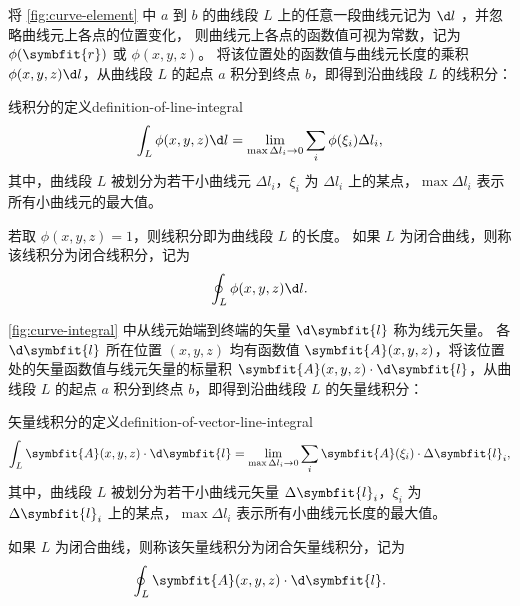 
将 \cref{fig:curve-element} 中 $ a $ 到 $ b $ 的曲线段 $ L $ 上的任意一段曲线元记为 $ \d l $ ，并忽略曲线元上各点的位置变化，
则曲线元上各点的函数值可视为常数，记为 $ \phi (\symbfit{r}) $ 或 $ \phi (x, y, z) $。
将该位置处的函数值与曲线元长度的乘积 $ \phi (x, y, z) \d l $，从曲线段 $ L $ 的起点 $ a $ 积分到终点 $ b $，即得到沿曲线段 $ L $ 的线积分：
\begin{definition}{线积分的定义}{definition-of-line-integral}
    \begin{equation}
        \int_L \phi (x, y, z) \d l = \lim_{\max \Delta l_i \to 0} \sum_{i} \phi (\xi_i) \Delta l_i ,
    \end{equation}
    其中，曲线段 $ L $ 被划分为若干小曲线元 $ \Delta l_i $，$ \xi_i $ 为 $ \Delta l_i $ 上的某点，$ \max \Delta l_i $ 表示所有小曲线元的最大值。
\end{definition}
若取 $ \phi (x, y, z) = 1 $，则线积分即为曲线段 $ L $ 的长度。
如果 $ L $ 为闭合曲线，则称该线积分为闭合线积分，记为
\begin{equation}
    \oint_L \phi (x, y, z) \d l .
\end{equation}

\bigskip


\cref{fig:curve-integral} 中从线元始端到终端的矢量 $ \d \symbfit{l} $ 称为线元矢量。
各 $ \d \symbfit{l} $ 所在位置 $ (x, y, z) $ 均有函数值 $ \symbfit{A} (x, y, z) $，将该位置处的矢量函数值与线元矢量的标量积 $ \symbfit{A} (x, y, z) \cdot \d \symbfit{l} $，从曲线段 $ L $ 的起点 $ a $ 积分到终点 $ b $，即得到沿曲线段 $ L $ 的矢量线积分：
\begin{definition}{矢量线积分的定义}{definition-of-vector-line-integral}
    \begin{equation}
        \int_L \symbfit{A} (x, y, z) \cdot \d \symbfit{l} = \lim_{\max \Delta l_i \to 0} \sum_{i} \symbfit{A} (\xi_i) \cdot \Delta \symbfit{l}_i ,
    \end{equation}
    其中，曲线段 $ L $ 被划分为若干小曲线元矢量 $ \Delta \symbfit{l}_i $，$ \xi_i $ 为 $ \Delta \symbfit{l}_i $ 上的某点，$ \max \Delta l_i $ 表示所有小曲线元长度的最大值。
\end{definition}

如果 $ L $ 为闭合曲线，则称该矢量线积分为闭合矢量线积分，记为
\begin{equation}
    \oint_L \symbfit{A} (x, y, z) \cdot \d \symbfit{l} .
\end{equation}

